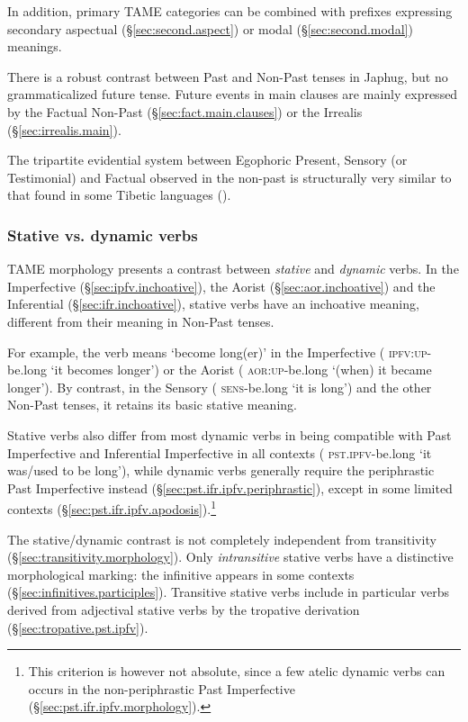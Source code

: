 In addition, primary TAME categories can be combined with prefixes expressing secondary aspectual (§\ref{sec:second.aspect}) or modal (§\ref{sec:second.modal}) meanings.

There is a robust contrast between Past and Non-Past tenses in Japhug, but no grammaticalized future tense. Future events in main clauses are mainly expressed by the Factual Non-Past (§\ref{sec:fact.main.clauses}) or the Irrealis (§\ref{sec:irrealis.main}).
 
The tripartite evidential system between Egophoric Present, Sensory (or Testimonial)  and Factual observed in the non-past is structurally very similar to that found in some Tibetic languages (\citealt{tournadre08conjunct, hill17evidential}).


\subsubsection{Stative vs. dynamic verbs}
TAME morphology presents a contrast between \textit{stative} and \textit{dynamic} verbs. In the  Imperfective (§\ref{sec:ipfv.inchoative}), the Aorist (§\ref{sec:aor.inchoative}) and the Inferential (§\ref{sec:ifr.inchoative}), stative verbs have an inchoative meaning, different from their meaning in Non-Past tenses.

For example, the verb  means `become long(er)' in the Imperfective ( \textsc{ipfv}:\textsc{up}-be.long `it becomes longer') or the Aorist ( \textsc{aor}:\textsc{up}-be.long `(when) it became longer'). By contrast, in the Sensory ( \textsc{sens}-be.long `it is long') and the other Non-Past tenses, it retains its basic stative meaning.

Stative verbs also differ from most dynamic verbs in being compatible with Past Imperfective and Inferential Imperfective in all contexts ( \textsc{pst}.\textsc{ipfv}-be.long `it was/used to be long'), while dynamic verbs generally require the periphrastic Past Imperfective instead (§\ref{sec:pst.ifr.ipfv.periphrastic}), except in some limited contexts (§\ref{sec:pst.ifr.ipfv.apodosis}).\footnote{This criterion is however not absolute, since a few atelic dynamic verbs can occurs in the non-periphrastic Past Imperfective (§\ref{sec:pst.ifr.ipfv.morphology}). }

The stative/dynamic contrast is not completely independent from transitivity (§\ref{sec:transitivity.morphology}). Only \textit{intransitive} stative verbs have a distinctive morphological marking: the  infinitive  appears in some contexts (§\ref{sec:infinitives.participles}). Transitive stative verbs include in particular verbs derived from adjectival stative verbs by the tropative derivation (§\ref{sec:tropative.pst.ipfv}).

